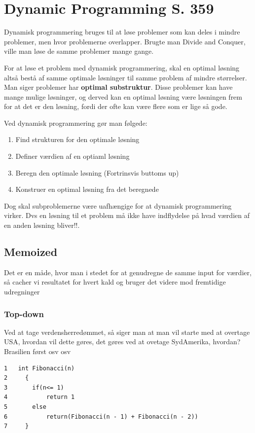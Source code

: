\documentclass[11pt,a4paper]{report}
\theoremstyle{plain}
\theoremstyle{definition}
\theoremstyle{remark}
\numberwithin{equation}{section}
\begin{document}
\chapter{Dynamic Programming S. 359}
Dynamisk programmering bruges til at løse problemer som kan deles i mindre problemer, men hvor problemerne overlapper. Brugte man Divide and Conquer, ville man løse de samme problemer mange gange.

For at løse et problem med dynamisk programmering, skal en  optimal løsning altså bestå af samme optimale løsninger til samme problem af mindre størrelser.
Man siger problemer har \textbf{optimal substruktur}. Disse problemer kan have mange mulige løsninger, og derved kan en optimal løsning være løsningen frem for at det er den løsning, fordi der ofte kan være flere som er lige så gode.

Ved dynamisk programmering gør man følgede:
\begin{enumerate}
  \item Find strukturen for den optimale løsning
  \item Definer værdien af en optiaml løsning
  \item Beregn den optimale løsning (Fortrinsvis buttoms up)
  \item Konstruer en optimal løsning fra det beregnede
\end{enumerate}

Dog skal subproblemerne være uafhængige for at dynamisk programmering virker. Dvs en løsning til et problem må ikke have indflydelse på hvad værdien af en anden løsning bliver!!.


\section{Memoized}
Det er en måde, hvor man i stedet for at genudregne de samme input for værdier, så cacher vi resultatet for hvert kald og bruger det videre mod fremtidige udregninger


\subsection{Top-down}
Ved at tage verdensherredømmet, så siger man at man vil starte med at overtage USA, hvordan vil dette gøres, det gøres ved at ovetage SydAmerika, hvordan? Brasilien først osv osv
\begin{lstlisting}
1   int Fibonacci(n)
2     {
3       if(n<= 1)
4           return 1
5       else
6           return(Fibonacci(n - 1) + Fibonacci(n - 2))
7     }
\end{lstlisting}
\end{document}
